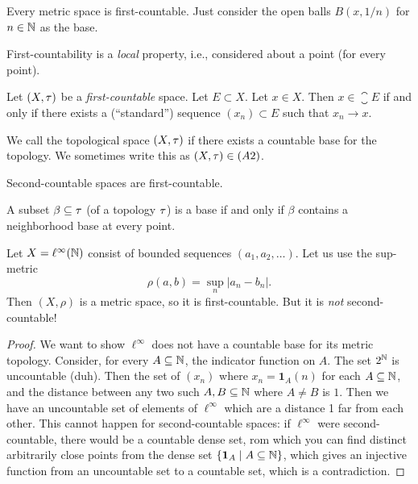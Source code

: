 \begin{example}
Every metric space is first-countable. Just consider the open balls
$B(x,1/n)$ for $n\in\mathbb{N}$ as the base.
\end{example}

\begin{remark}
First-countability is a \emph{local} property, i.e., considered about
a point (for every point).
\end{remark}

\begin{theorem}
Let $(X,\tau)$ be a \emph{first-countable} space. Let $E\subset X$.
Let $x\in X$. Then $x\in\closure{E}$ if and only if there exists a
(``standard'') sequence $(x_{n})\subset E$ such that $x_{n}\to x$.
\end{theorem}

\begin{definition}
We call the topological space $(X,\tau)$ 
if there exists a countable base for the topology. We sometimes write
this as $(X,\tau)\in(A2)$.
\end{definition}

\begin{theorem}
Second-countable spaces are first-countable.
\end{theorem}

\begin{lemma}
A subset $\beta\subseteq\tau$ (of a topology $\tau$) is a base
if and only if $\beta$ contains a neighborhood base at every point.
\end{lemma}

\begin{example}
Let $X=\ell^{\infty}(\mathbb{N})$ consist of bounded sequences
$(a_{1},a_{2},\dots)$. Let us use the sup-metric
\begin{equation}
\rho(a,b)=\sup_{n}|a_{n}-b_{n}|.
\end{equation}
Then $(X,\rho)$ is a metric space, so it is first-countable. But it is
\emph{not} second-countable!
\end{example}

\begin{proof}
We want to show $\ell^{\infty}$ does not have a countable base for its
metric topology. Consider, for every $A\subseteq\mathbb{N}$, the indicator
function on $A$. The set $2^{\mathbb{N}}$ is uncountable (duh). Then the set
of $(x_{n})$ where $x_{n}=\mathbf{1}_{A}(n)$ for each $A\subseteq\mathbb{N}$,
and the distance between any two such $A,B\subseteq\mathbb{N}$ where $A\neq B$
is $1$. Then we have an uncountable set of elements of $\ell^{\infty}$
which are a distance 1 far from each other. This cannot happen for
second-countable spaces: if $\ell^{\infty}$ were second-countable,
there would be a countable dense set, rom which you can find distinct
arbitrarily close points from the dense set $\{\mathbf{1}_{A}\mid A\subseteq\mathbb{N}\}$,
which gives an injective function from an uncountable set to a
countable set, which is a contradiction.
\end{proof}
